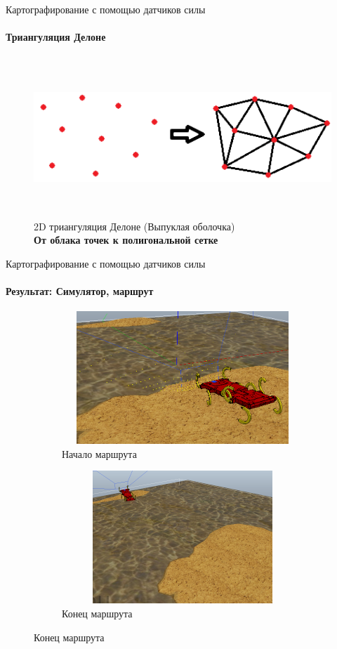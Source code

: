 \documentclass[aspectratio=169,xcolor=table]{beamer}
\begin{document}
\begin{frame}[t]{Картографирование с помощью датчиков силы}
    \framesubtitle{Триангуляция Делоне}
    \vspace{-0.2cm}
    \begin{figure}[H]
        \centering\includegraphics[height=6cm,width=1\textwidth,keepaspectratio]{delone_idea.png}
        \caption*{2D триангуляция Делоне (Выпуклая оболочка) \\ \textbf{От облака точек к полигональной сетке}}
        \label{fig:delone_idea.png}
    \end{figure}
\end{frame}

\begin{frame}[t]{Картографирование с помощью датчиков силы}
    \framesubtitle{Результат: Симулятор, маршрут}
    \vspace{-15pt}
    \begin{figure}[H]
        \begin{subfigure}[t]{0.49\textwidth}
            \centering\includegraphics[height=5cm,width=1\textwidth,keepaspectratio]{terrain_w_water1.png}
            \caption*{Начало маршрута}
        \end{subfigure}
        \begin{subfigure}[t]{0.49\textwidth}
            \centering\includegraphics[height=5cm,width=1\textwidth,keepaspectratio]{terrain_w_water_end.png}
            \caption*{Конец маршрута}
        \end{subfigure}
    \end{figure}
\end{frame}
\end{document}
